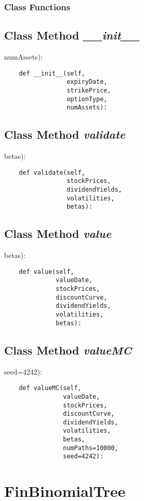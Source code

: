 \documentclass[twoside,11pt]{book}
\begin{document}
\subsubsection{Class Functions}

\subsection{Class Method {\it \_\_init\_\_}}
numAssets):

\begin{lstlisting}
    def __init__(self,
                 expiryDate,
                 strikePrice,
                 optionType,
                 numAssets):
\end{lstlisting}

\subsection{Class Method {\it validate}}
betas):

\begin{lstlisting}
    def validate(self,
                 stockPrices,
                 dividendYields,
                 volatilities,
                 betas):
\end{lstlisting}

\subsection{Class Method {\it value}}
betas):

\begin{lstlisting}
    def value(self,
              valueDate,
              stockPrices,
              discountCurve,
              dividendYields,
              volatilities,
              betas):
\end{lstlisting}

\subsection{Class Method {\it valueMC}}
seed=4242):

\begin{lstlisting}
    def valueMC(self,
                valueDate,
                stockPrices,
                discountCurve,
                dividendYields,
                volatilities,
                betas,
                numPaths=10000,
                seed=4242):
\end{lstlisting}

\newpage
\section{FinBinomialTree}
\end{document}
